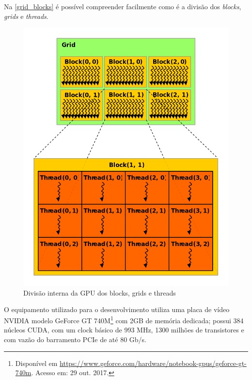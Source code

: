 \documentclass[
	12pt,				%
	openright,			%
	twoside,			%
	a4paper,			%
	english,			%
	french,				%
	spanish,			%
	brazil				%
	]{abntex2}
\begin{document}


Na \autoref{grid_blocks} é possível compreender facilmente como é a divisão dos \textit{blocks}, \textit{grids} e \textit{threads}.

\begin{figure}[ht]
	\caption{\label{grid_blocks}Divisão interna da GPU dos blocks, grids e threads}
	\begin{center}
		\includegraphics[scale=0.4]{images/block-grid.jpg}
	\end{center}
\end{figure}

O equipamento utilizado para o desenvolvimento utiliza uma placa de vídeo NVIDIA modelo GeForce GT 740M\footnote{Disponível em \url{https://www.geforce.com/hardware/notebook-gpus/geforce-gt-740m}. Acesso em: 29 out. 2017.} com 2GB de memória dedicada; possui 384 núcleos CUDA, com um clock básico de 993 MHz, 1300 milhões de transistores e com vazão do barramento PCIe de até 80 Gb/s.
\end{document}
